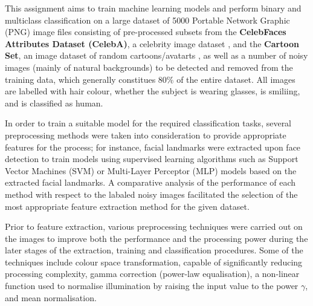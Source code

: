 \documentclass[conference]{IEEEtran}
\begin{document}
This assignment aims to train machine learning models and perform binary and multiclass classification on a large dataset of 5000 Portable Network Graphic (PNG) image files consisting of pre-processed subsets from the \textbf{CelebFaces Attributes Dataset (CelebA)}, a celebrity image dataset  %
, and the \textbf{Cartoon Set}, an image dataset of random cartoons/avatarts %
, as well as a number of noisy images (mainly of natural backgrounds) to be detected and removed from the training data, which generally constitues 80\% of the entire dataset.
All images are labelled with hair colour, whether the subject is wearing glasses, is smiliing, and is classified as human.

In order to train a suitable model for the required classification tasks, several preprocessing methods were taken into consideration to provide appropriate features for the process; for instance, facial landmarks were extracted upon face detection to train models using supervised learning algorithms such as Support Vector Machines (SVM) or  Multi-Layer Perceptor (MLP) models based on the extracted facial landmarks.
A comparative analysis of the performance of each method with respect to the labaled noisy images %
facilitated the selection of the most appropriate feature extraction method for the given dataset.

Prior to feature extraction, various preprocessing techniques were carried out on the images to improve both the performance and the processing power during the later stages of the extraction, training and classification procedures. 
Some of the techniques include colour space transformation, capable of significantly reducing processing complexity, gamma correction (power-law equalisation), a non-linear function used to normalise illumination by raising the input value to the power $\gamma$, and mean normalisation.%
\end{document}
